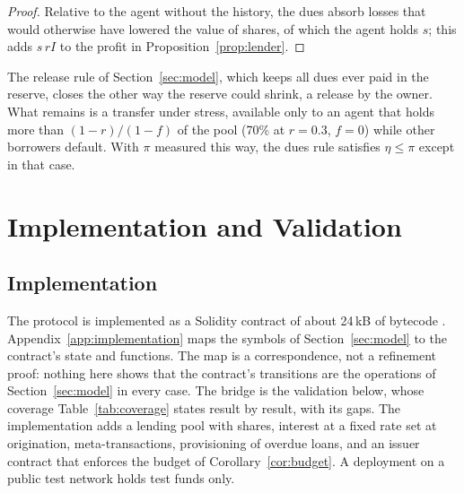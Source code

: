 \documentclass[acmsmall,nonacm,screen]{acmart}
\theoremstyle{acmdefinition}%
\begin{document}
\begin{proof}
Relative to the agent without the history, the dues absorb losses that would otherwise have lowered
the value of shares, of which the agent holds $s$; this adds $s\,rI$ to the profit in
Proposition~\ref{prop:lender}.
\end{proof}

The release rule of Section~\ref{sec:model}, which keeps all dues ever paid in the reserve, closes the
other way the reserve could shrink, a release by the owner. What remains is a transfer under stress,
available only to an agent that holds more than $(1-r)/(1-f)$ of the pool (70\% at $r=0.3$, $f=0$)
while other borrowers default. With $\pi$ measured this way, the dues rule satisfies $\eta\le\pi$
except in that case.

\section{Implementation and Validation}\label{sec:validation}

\subsection{Implementation}

The protocol is implemented as a Solidity contract of about 24\,kB of bytecode
\citep{microcredit2026contract}. Appendix~\ref{app:implementation} maps the symbols of
Section~\ref{sec:model} to the contract's state and functions. The map is a correspondence, not a
refinement proof: nothing here shows that the contract's transitions are the operations of
Section~\ref{sec:model} in every case. The bridge is the validation below, whose coverage
Table~\ref{tab:coverage} states result by result, with its gaps. The implementation adds a lending
pool with shares, interest at a fixed rate set at origination, meta-transactions, provisioning of
overdue loans, and an issuer contract that enforces the budget of Corollary~\ref{cor:budget}. A
deployment on a public test network holds test funds only.
\end{document}
